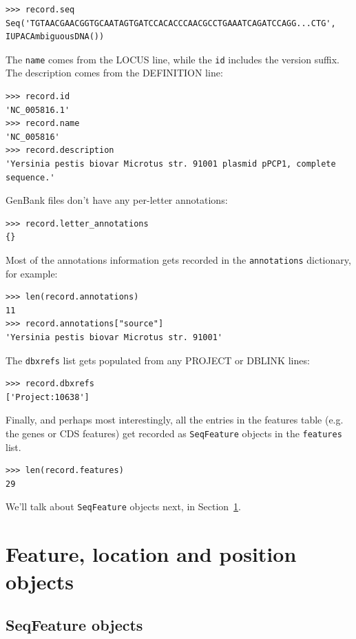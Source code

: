 \documentclass{report}
\begin{document}
\begin{verbatim}
>>> record.seq
Seq('TGTAACGAACGGTGCAATAGTGATCCACACCCAACGCCTGAAATCAGATCCAGG...CTG', IUPACAmbiguousDNA())
\end{verbatim}

The \verb|name| comes from the LOCUS line, while the \verb|id| includes the version suffix.
The description comes from the DEFINITION line:

\begin{verbatim}
>>> record.id
'NC_005816.1'
>>> record.name
'NC_005816'
>>> record.description
'Yersinia pestis biovar Microtus str. 91001 plasmid pPCP1, complete sequence.'
\end{verbatim}

GenBank files don't have any per-letter annotations:

\begin{verbatim}
>>> record.letter_annotations
{}
\end{verbatim}

Most of the annotations information gets recorded in the \verb|annotations| dictionary, for example:

\begin{verbatim}
>>> len(record.annotations)
11
>>> record.annotations["source"]
'Yersinia pestis biovar Microtus str. 91001'
\end{verbatim}

The \verb|dbxrefs| list gets populated from any PROJECT or DBLINK lines:

\begin{verbatim}
>>> record.dbxrefs
['Project:10638']
\end{verbatim}

Finally, and perhaps most interestingly, all the entries in the features table (e.g. the genes or CDS features) get recorded as \verb|SeqFeature| objects in the \verb|features| list.

\begin{verbatim}
>>> len(record.features)
29
\end{verbatim}

\noindent We'll talk about \verb|SeqFeature| objects next, in
Section~\ref{sec:seq_features}.

\section{Feature, location and position objects}
\label{sec:seq_features}

\subsection{SeqFeature objects}
\end{document}
